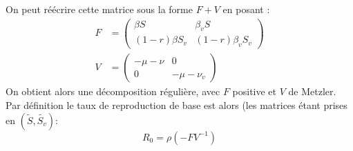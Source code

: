 \documentclass[11pt]{article}
\begin{document}
On peut r\'e\'ecrire cette matrice sous la forme $F + V$ en posant :
 \begin{align*}
 	F &= \begin{pmatrix}
		\beta S  & \beta_v S\\
 		(1-r)\beta S_v & (1-r)\beta_v S_v 
	\end{pmatrix}\\
	V &= \begin{pmatrix}
		- \mu - \nu  & 0\\
 		0 &  - \mu - \nu_v 
	\end{pmatrix}
 \end{align*}
On obtient alors une d\'ecomposition r\'eguli\`ere, avec  $F$ positive et $V$ de Metzler. Par d\'efinition le taux de reproduction de base est alors (les matrices \'etant prises en $(\tilde S, \tilde {S_v})$:
\[
R_0 = \rho (-F V^{-1})
\]
\end{document}
